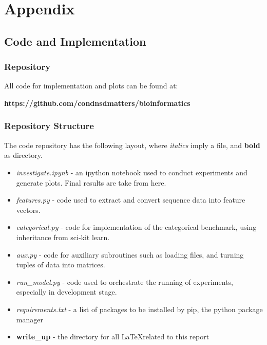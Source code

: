 \documentclass{bioinfo}
\begin{document}
\section{Appendix}
\subsection{Code and Implementation}

\subsubsection{Repository}
All code for implementation and plots can be found at:

 \textbf{https://github.com/condnsdmatters/bioinformatics}

\subsubsection{Repository Structure}
The code repository has the following layout, where \textit{italics} imply a file, and \textbf{bold} as directory.
\begin{itemize}
  \item{\textit{investigate.ipynb}} - an ipython notebook used to conduct experiments and generate plots. Final results are take from here.
  \item{\textit{features.py}} - code used to extract and convert sequence data into feature vectors.
  \item{\textit{categorical.py}} - code for implementation of the categorical benchmark, using inheritance from sci-kit learn.
  \item{\textit{aux.py}} - code for auxiliary subroutines such as loading files, and turning tuples of data into matrices.
  \item{\textit{run\_model.py}} -  code used to orchestrate the running of experiments, especially in development stage.
  \item{\textit{requirements.txt}} - a list of packages to be installed by pip, the python package manager
  \item{\textbf{write\_up}} - the directory for all \LaTeX related to this report
\end{itemize}
\end{document}
